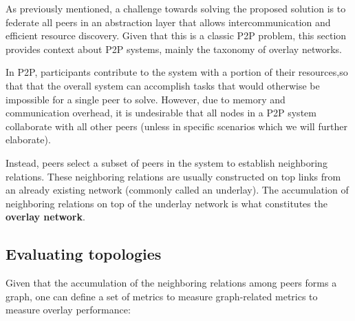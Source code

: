 

As previously mentioned, a challenge towards solving the proposed solution is to federate all peers in an abstraction layer that allows intercommunication and efficient resource discovery. Given that this is a classic P2P problem, this section provides context about P2P systems, mainly the taxonomy of overlay networks.

In P2P, participants contribute to the system with a portion of their resources,so that that the overall system can accomplish tasks that would otherwise be impossible for a single peer to solve. However, due to memory and communication overhead, it is undesirable that all nodes in a P2P system collaborate with all other peers (unless in specific scenarios which we will further elaborate). 

Instead, peers select a subset of peers in the system to establish neighboring relations. These neighboring relations are usually constructed on top links from an already existing network (commonly called an underlay). The accumulation of neighboring relations on top of the underlay network is what constitutes the \textbf{overlay network}. 

\subsection{Evaluating topologies}

Given that the accumulation of the neighboring relations among peers forms a graph, one can define a set of metrics to measure graph-related metrics to measure overlay performance:

